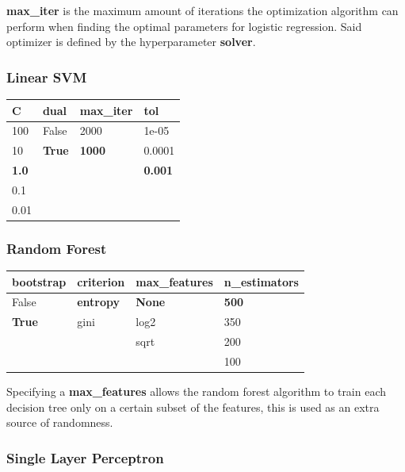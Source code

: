 \documentclass[epsfig,a4paper,11pt,titlepage,twoside,openany]{book}
\begin{document}
\textbf{max\_iter} is the maximum amount of iterations the optimization algorithm can perform when finding the optimal parameters for logistic regression. Said optimizer is defined by the hyperparameter \textbf{solver}.


\subsubsection{Linear SVM}

\begin{table}[H]
\centering
\begin{tabular}{l|l|l|l}
C            & dual          & max\_iter     & tol            \\ \hline
100          & False         & 2000          & 1e-05          \\
10           & \textbf{True} & \textbf{1000} & 0.0001         \\
\textbf{1.0} &               &               & \textbf{0.001} \\
0.1          &               &               &                \\
0.01         &               &               & 
\end{tabular}
\end{table}


\subsubsection{Random Forest}

\begin{table}[H]
\centering
\begin{tabular}{l|l|l|l}
bootstrap     & criterion        & max\_features & n\_estimators \\ \hline
False         & \textbf{entropy} & \textbf{None} & \textbf{500}  \\
\textbf{True} & gini             & log2          & 350           \\
              &                  & sqrt          & 200           \\
              &                  &               & 100          
\end{tabular}
\end{table}

Specifying a \textbf{max\_features} allows the random forest algorithm to train each decision tree only on a certain subset of the features, this is used as an extra source of randomness.

\subsubsection{Single Layer Perceptron}
\end{document}
